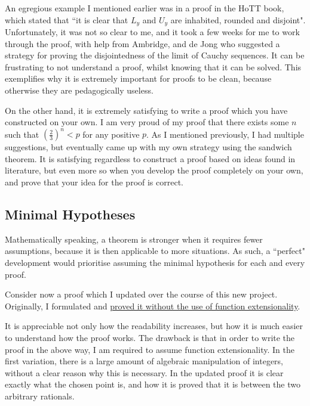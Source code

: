 \documentclass[ProjectReport]{subfiles}
\begin{document}
An egregious example I mentioned earlier was in a proof in the HoTT book, which stated that ``it is clear that $L_y$ and $U_y$ are inhabited, rounded and disjoint". Unfortunately, it was not so clear to me, and it took a few weeks for me to work through the proof, with help from Ambridge, and de Jong who suggested a strategy for proving the disjointedness of the limit of Cauchy sequences. It can be frustrating to not understand a proof, whilst knowing that it can be solved. This exemplifies why it is extremely important for proofs to be clean, because otherwise they are pedagogically useless. 

On the other hand, it is extremely satisfying to write a proof which you have constructed on your own. I am very proud of my proof that there exists some $n$ such that $(\frac{2}{3})^n < p$ for any positive $p$. As I mentioned previously, I had multiple suggestions, but eventually came up with my own strategy using the sandwich theorem. It is satisfying regardless to construct a proof based on ideas found in literature, but even more so when you develop the proof completely on your own, and prove that your idea for the proof is correct. 

\subsection{Minimal Hypotheses}

Mathematically speaking, a theorem is stronger when it requires fewer assumptions, because it is then applicable to more situations. As such, a ``perfect" development would prioritise assuming the minimal hypothesis for each and every proof. 

Consider now a proof which I updated over the course of this new project. Originally, I formulated and \href{https://adsneap.github.io/CSProject/Rationals.html#27337}{proved it without the use of function extensionality}. 


It is appreciable not only how the readability increases, but how it is much easier to understand how the proof works. The drawback is that in order to write the proof in the above way, I am required to assume function extensionality. In the first variation, there is a large amount of algebraic manipulation of integers, without a clear reason why this is necessary. In the updated proof it is clear exactly what the chosen point is, and how it is proved that it is between the two arbitrary rationals. 
\end{document}
